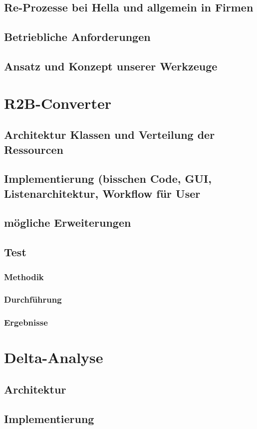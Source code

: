 \documentclass[12pt]{report}
\begin{document}
\section{Re-Prozesse bei Hella und allgemein in Firmen}
\section{Betriebliche Anforderungen}
\section{Ansatz und Konzept unserer Werkzeuge}
\chapter{R2B-Converter}
\section{Architektur Klassen und Verteilung der Ressourcen}
\section{Implementierung (bisschen Code, GUI, Listenarchitektur, Workflow für User}
\section{mögliche Erweiterungen}
\section{Test}
\subsection{Methodik}
\subsection{Durchführung}
\subsection{Ergebnisse}
\chapter{Delta-Analyse}
\section{Architektur}
\section{Implementierung}
\end{document}

